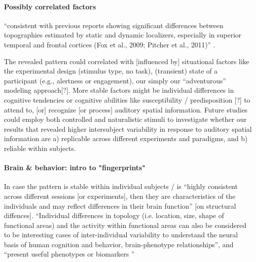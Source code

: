 \paragraph{Possibly correlated factors}


``consistent with previous reports showing significant differences between
topographies estimated by static and dynamic localizers, especially in superior
temporal and frontal cortices (Fox et al., 2009; Pitcher et al., 2011)''
\citep{jiahui2022cross}.

%
The revealed pattern could correlated with [influenced by] situational factors
like the experimental design (stimulus type, no task), (transient) state of a
participant (e.g., alertness or engagement),  our simply our ``adventurous''
modeling approach[?].
%
%
More stable factors might be individual differences in cognitive tendencies or
cognitive abilities like susceptibility / predisposition [?] to attend to, [or]
recognize [or process] auditory spatial information.
Future studies could employ both controlled and naturalistic stimuli to
investigate whether our results that revealed higher intersubject variability in
response to auditory spatial information are a) replicable across different
experiments and paradigms, and b) reliable within subjects.


\paragraph{Brain \& behavior: intro to "fingerprints"}


In case the pattern is stable within individual subjects / is ``highly
consistent across different sessions [or experiments], then they are
characteristics of the individuals and may reflect differences in their brain
function'' \citep{kanai2011structural} [on structural diffences].
%
``Individual differences in topology (i.e. location, size, shape of functional
areas) and the activity within functional areas can also be considered to be
interesting cases of inter-individual variability to understand the neural basis
of human cognition and behavior, brain-phenotype relationships'', and ``present
useful phenotypes or biomarkers \citep{glasser2016multi,
vanhorn2008individual}''
%

